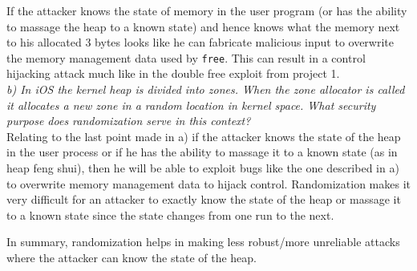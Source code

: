 If the attacker knows the state of memory in the user program (or has the ability to massage the heap to a known state) and hence knows what the memory next to his allocated 3 bytes looks like he can fabricate malicious input to overwrite the memory management data used by \verb+free+. This can result in a control hijacking attack much like in the double free exploit from project 1. \\

\noindent \textit{b) In iOS the kernel heap is divided into zones. When the zone allocator is called it allocates a new zone in a random location in kernel space. What security purpose does randomization serve in this context?}\\

\noindent Relating to the last point made in a) if the attacker knows the state of the heap in the user process or if he has the ability to massage it to a known state (as in heap feng shui), then he will be able to exploit bugs like the one described in a) to overwrite memory management data to hijack control. Randomization makes it very difficult for an attacker to exactly know the state of the heap or massage it to a known state since the state changes from one run to the next. 

In summary, randomization helps in making less robust/more unreliable attacks where the attacker can know the state of the heap.